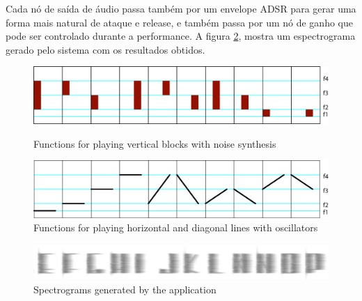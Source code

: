 Cada nó de saída de áudio passa também por um envelope ADSR \cite{Lee2016} para gerar uma forma mais natural de ataque e release, e também passa por um nó de ganho que pode ser controlado durante a performance. A figura \ref{fig:spectro}, mostra um espectrograma gerado pelo sistema com os resultados obtidos.


\begin{figure}[!ht]
    \centering
        \includegraphics[width=1\textwidth]{pictures/audiotype_v1_noise}
        \vspace{-10pt}
    \caption{Functions for playing vertical blocks with noise synthesis}
    \vspace{10pt}
    \label{fig:noise}
        \centering
        \includegraphics[width=1\textwidth]{pictures/audiotype_v1_sine}
    \caption{Functions for playing horizontal and diagonal lines with oscillators}
    \vspace{-10pt}
    \label{fig:sine}
\vspace{10pt}
\end{figure}

\begin{figure}[!ht]
    \centering
        \includegraphics[width=1\textwidth]{pictures/spectrogram}
        \vspace{-10pt}
    \caption{Spectrograms generated by the application}
    \vspace{-10pt}
    \label{fig:spectro}
\end{figure}

